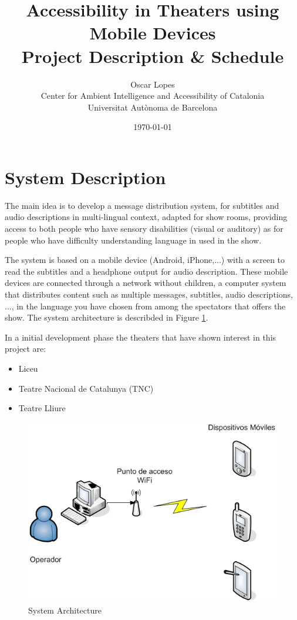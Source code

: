 \documentclass[10pt, oneside, a4paper]{article}
\title{ Accessibility in Theaters using Mobile Devices \\ Project Description \& Schedule}
\author{Oscar Lopes
\\ 
Center for Ambient Intelligence and Accessibility of Catalonia
\\ Universitat Autònoma de Barcelona}
\date{\today}
\begin{document}
\maketitle

\section{System Description}

The main idea is to develop a message distribution system, for subtitles and audio descriptions in multi-lingual context, adapted for show rooms, providing access to both people who have sensory disabilities (visual or auditory) as for people who have difficulty understanding language in used in the show.

The system is based on a mobile device (Android, iPhone,...) with a screen to read the subtitles and a headphone output for audio description. These mobile devices are connected through a network without children, a computer system that distributes content such as multiple messages, subtitles, audio descriptions, ..., in the language you have chosen from among the spectators that offers the show. The system architecture is describded in Figure \ref{figs:systemarch}.

In a initial development phase the theaters that have shown interest in this project are:
\begin{itemize}
\item Liceu
\item Teatre Nacional de Catalunya (TNC)
\item Teatre Lliure
\end{itemize}

\begin{figure}[t]
\centering
\includegraphics[scale=2.5]{pics/arch.png}
\caption{System Architecture}
\label{figs:systemarch}
\end{figure}
\end{document}
